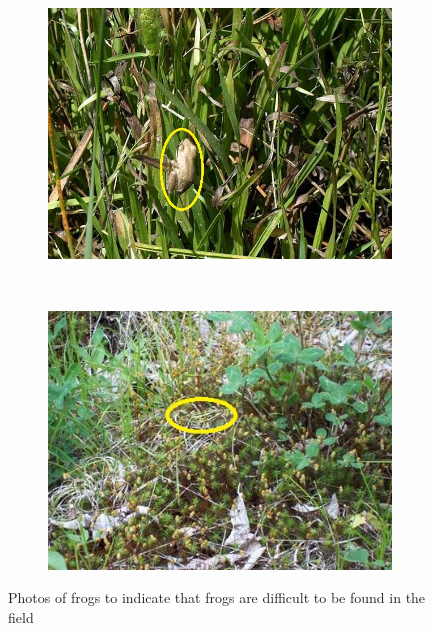 \begin{figure}[htb!]
\centering
      \begin{subfigure}[b]{0.5\textwidth}
           \includegraphics[width=1\textwidth,height=0.75\textwidth]{image/Ch1/unseen_frog_1.jpg}
    \end{subfigure}%
	~~
	      \begin{subfigure}[b]{0.5\textwidth}
           \includegraphics[width=1\textwidth,height=0.75\textwidth]{image/Ch1/unseen_frog_2.jpg}
    \end{subfigure}%
\caption[Photos of frogs]{Photos of frogs to indicate that frogs are difficult to be found in the field}
\label{fig:Ch1_frogs}       %
\end{figure}



